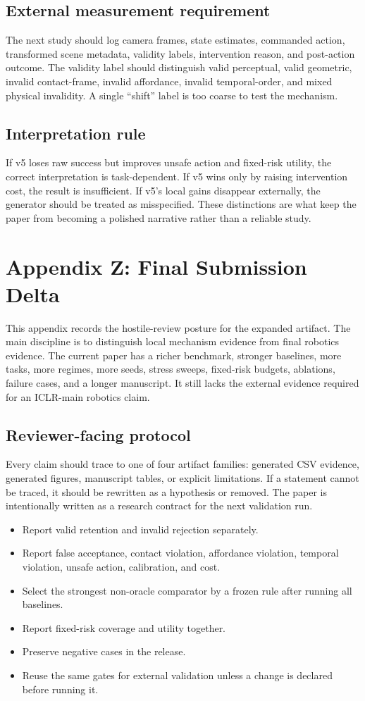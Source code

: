 \documentclass{article}
\begin{document}
\subsection{External measurement requirement}
The next study should log camera frames, state estimates, commanded action, transformed scene metadata, validity labels, intervention reason, and post-action outcome. The validity label should distinguish valid perceptual, valid geometric, invalid contact-frame, invalid affordance, invalid temporal-order, and mixed physical invalidity. A single ``shift'' label is too coarse to test the mechanism.

\subsection{Interpretation rule}
If v5 loses raw success but improves unsafe action and fixed-risk utility, the correct interpretation is task-dependent. If v5 wins only by raising intervention cost, the result is insufficient. If v5's local gains disappear externally, the generator should be treated as misspecified. These distinctions are what keep the paper from becoming a polished narrative rather than a reliable study.


\section{Appendix Z: Final Submission Delta}
This appendix records the hostile-review posture for the expanded artifact. The main discipline is to distinguish local mechanism evidence from final robotics evidence. The current paper has a richer benchmark, stronger baselines, more tasks, more regimes, more seeds, stress sweeps, fixed-risk budgets, ablations, failure cases, and a longer manuscript. It still lacks the external evidence required for an ICLR-main robotics claim.

\subsection{Reviewer-facing protocol}
Every claim should trace to one of four artifact families: generated CSV evidence, generated figures, manuscript tables, or explicit limitations. If a statement cannot be traced, it should be rewritten as a hypothesis or removed. The paper is intentionally written as a research contract for the next validation run.

\begin{itemize}
\item Report valid retention and invalid rejection separately.
\item Report false acceptance, contact violation, affordance violation, temporal violation, unsafe action, calibration, and cost.
\item Select the strongest non-oracle comparator by a frozen rule after running all baselines.
\item Report fixed-risk coverage and utility together.
\item Preserve negative cases in the release.
\item Reuse the same gates for external validation unless a change is declared before running it.
\end{itemize}
\end{document}
